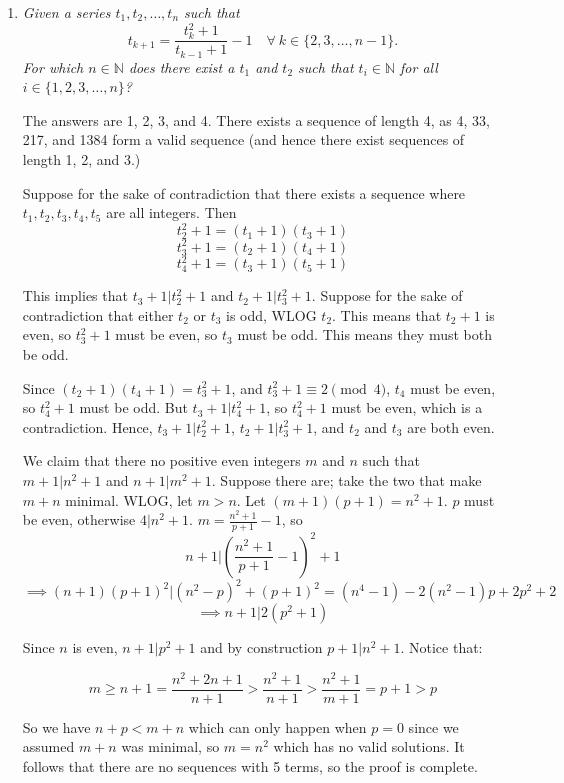 \documentclass{article}
\begin{document}
\begin{enumerate}
\medskip
\item %
{\itshape Given a series $t_1, t_2, \dotsc, t_n$ such that 
\[ t_{k + 1} = \frac{t_k^2 + 1}{t_{k-1} + 1} - 1 \quad \forall \ k \in \{2, 3, \dots, n-1\}. \]
For which $n \in \mathbb{N}$ does there exist a $t_1$ and $t_2$ such that $t_i \in \mathbb{N}$ for all $i \in \{1, 2, 3, \dotsc, n\}$?}

The answers are 1, 2, 3, and 4. There exists a sequence of length 4, as 4, 33, 217, and 1384 form a valid sequence (and hence there exist sequences of length 1, 2, and 3.)

Suppose for the sake of contradiction that there exists a sequence where $t_1, t_2, t_3, t_4, t_5$ are all integers. Then $$t_2^2 + 1 = (t_1 + 1)(t_3 + 1)$$ 
$$t_3^2 + 1 = (t_2 + 1)(t_4 + 1)$$
$$t_4^2 + 1 = (t_3 + 1)(t_5 + 1)$$

This implies that $t_3 + 1 | t_2^2 + 1$ and $t_2 + 1 | t_3^2 + 1$. Suppose for the sake of contradiction that either $t_2$ or $t_3$ is odd, WLOG $t_2$. This means that $t_2 + 1$ is even, so $t_3^2 + 1$ must be even, so $t_3$ must be odd. This means they must both be odd. 

Since $(t_2 + 1)(t_4 + 1) = t_3^2 + 1$, and $t_3^2 + 1 \equiv 2 \pmod{4}$, $t_4$ must be even, so $t_4^2 + 1$ must be odd. But $t_3 + 1 | t_4^2 + 1$, so $t_4^2 + 1$ must be even, which is a contradiction. Hence, $t_3 + 1 | t_2^2 + 1$, $t_2 + 1 | t_3^2 + 1$, and $t_2$ and $t_3$ are both even.

We claim that there no positive even integers $m$ and $n$ such that $m+1 | n^2 + 1$ and $n+1 | m^2 + 1$. Suppose there are; take the two that make $m + n$ minimal. WLOG, let $m > n$. 
Let $(m+1)(p+1) = n^2 + 1$. $p$ must be even, otherwise $4 | n^2 + 1$. $m = \frac{n^2+1}{p+1} - 1$, so 
$$n + 1 | \left(\frac{n^2+1}{p+1} - 1\right)^2 + 1$$
$$ \implies (n+1)(p+1)^2 | (n^2 - p)^2 + (p+1)^2 = (n^4 - 1) - 2(n^2 - 1)p + 2p^2 + 2$$
$$\implies n+1 | 2(p^2+1)$$ 

Since $n$ is even, $n + 1 | p^2 + 1$ and by construction $p + 1 | n^2 + 1$. Notice that:

$$m \ge n + 1 = \frac{n^2 + 2n + 1}{n + 1} > \frac{n^2 + 1}{n + 1} > \frac{n^2 + 1}{m + 1} = p + 1 > p$$

So we have $n + p < m + n$ which can only happen when $p = 0$ since we assumed $m + n$ was minimal, so $m = n^2$ which has no valid solutions. It follows that there are no sequences with 5 terms, so the proof is complete.




\end{enumerate}
\end{document}
